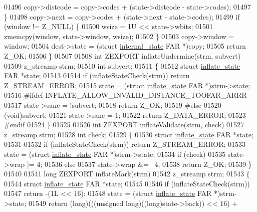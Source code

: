 \begin{DoxyCode}
{{{{{{{{{{{{01496         copy->distcode = copy->codes + (state->distcode - state->codes);
01497     \}
01498     copy->next = copy->codes + (state->next - state->codes);
01499     \textcolor{keywordflow}{if} (window != Z\_NULL) \{
01500         wsize = 1U << state->wbits;
01501         zmemcpy(window, state->window, wsize);
01502     \}
01503     copy->window = window;
01504     dest->state = (\textcolor{keyword}{struct }\hyperlink{structinternal__state}{internal\_state} FAR *)copy;
01505     \textcolor{keywordflow}{return} Z\_OK;
01506 \}
01507 
01508 \textcolor{keywordtype}{int} ZEXPORT inflateUndermine(strm, subvert)
01509 z\_streamp strm;
01510 \textcolor{keywordtype}{int} subvert;
01511 \{
01512     \textcolor{keyword}{struct }\hyperlink{structinflate__state}{inflate\_state} FAR *state;
01513 
01514     \textcolor{keywordflow}{if} (inflateStateCheck(strm)) \textcolor{keywordflow}{return} Z\_STREAM\_ERROR;
01515     state = (\textcolor{keyword}{struct }\hyperlink{structinflate__state}{inflate\_state} FAR *)strm->state;
01516 #ifdef INFLATE\_ALLOW\_INVALID\_DISTANCE\_TOOFAR\_ARRR
01517     state->sane = !subvert;
01518     \textcolor{keywordflow}{return} Z\_OK;
01519 #else
01520     (\textcolor{keywordtype}{void})subvert;
01521     state->sane = 1;
01522     \textcolor{keywordflow}{return} Z\_DATA\_ERROR;
01523 \textcolor{preprocessor}{#endif}
01524 \}
01525 
01526 \textcolor{keywordtype}{int} ZEXPORT inflateValidate(strm, check)
01527 z\_streamp strm;
01528 \textcolor{keywordtype}{int} check;
01529 \{
01530     \textcolor{keyword}{struct }\hyperlink{structinflate__state}{inflate\_state} FAR *state;
01531 
01532     \textcolor{keywordflow}{if} (inflateStateCheck(strm)) \textcolor{keywordflow}{return} Z\_STREAM\_ERROR;
01533     state = (\textcolor{keyword}{struct }\hyperlink{structinflate__state}{inflate\_state} FAR *)strm->state;
01534     if (check)
01535         state->wrap |= 4;
01536     \textcolor{keywordflow}{else}
01537         state->wrap &= ~4;
01538     \textcolor{keywordflow}{return} Z\_OK;
01539 \}
01540 
01541 \textcolor{keywordtype}{long} ZEXPORT inflateMark(strm)
01542 z\_streamp strm;
01543 \{
01544     \textcolor{keyword}{struct }\hyperlink{structinflate__state}{inflate\_state} FAR *state;
01545 
01546     \textcolor{keywordflow}{if} (inflateStateCheck(strm))
01547         \textcolor{keywordflow}{return} -(1L << 16);
01548     state = (\textcolor{keyword}{struct }\hyperlink{structinflate__state}{inflate\_state} FAR *)strm->state;
01549     return (\textcolor{keywordtype}{long})(((\textcolor{keywordtype}{unsigned} long)((\textcolor{keywordtype}{long})state->back)) << 16) +
}}}}}}}}}}}}
\end{DoxyCode}
